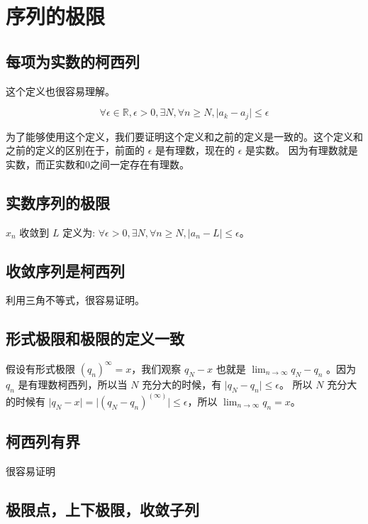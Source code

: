 \section{序列的极限}

\subsection{每项为实数的柯西列}

这个定义也很容易理解。

\[ \forall \epsilon \in \mathbb{R}, \epsilon >0, \exists N, \forall n \ge N, \lvert a_k - a_j \rvert \le \epsilon \]

为了能够使用这个定义，我们要证明这个定义和之前的定义是一致的。这个定义和之前的定义的区别在于，前面的 $\epsilon $ 是有理数，现在的 $\epsilon$ 是实数。
因为有理数就是实数，而正实数和0之间一定存在有理数。

\subsection{实数序列的极限}

$x_n$ 收敛到 $L$ 定义为: $\forall \epsilon > 0, \exists N, \forall n \ge N, \lvert a_n -L \rvert \le \epsilon $。


\subsection{收敛序列是柯西列}

利用三角不等式，很容易证明。

\subsection{形式极限和极限的定义一致}

假设有形式极限 $(q_n)^{\infty} = x$，我们观察 $q_N - x$ 也就是 $\lim_{n \to \infty} q_N - q_n$ 。因为 $q_n$ 是有理数柯西列，所以当 $N$ 充分大的时候，有 $\lvert q_N - q_n \rvert \le \epsilon $。
所以 $N$ 充分大的时候有 $ \lvert q_N - x \rvert = \lvert (q_N - q_n)^{(\infty)} \rvert \le \epsilon $，所以 $\lim_{n \to \infty} q_n = x$。\\

\subsection{柯西列有界}

很容易证明

\subsection{极限点，上下极限，收敛子列}

